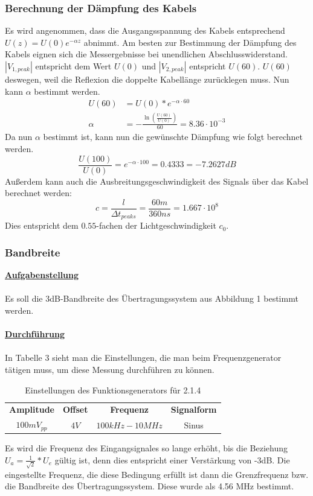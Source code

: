 \documentclass[a4paper,12pt]{article}
\begin{document}
	\subsubsection{Berechnung der Dämpfung des Kabels}
	Es wird angenommen, dass die Ausgangsspannung des Kabels entsprechend 
	\newline
	$U(z) = U(0)e^{-\alpha z}$ abnimmt. Am besten zur Bestimmung der Dämpfung des Kabels eignen sich die Messergebnisse bei unendlichen Abschlusswiderstand. $|V_{1,peak}|$ entspricht dem Wert $U(0)$ und $|V_{2,peak}|$ entspricht $U(60)$. $U(60)$ deswegen, weil die Reflexion die doppelte Kabellänge zurücklegen muss. Nun kann $\alpha$ bestimmt werden.
	\begin{align*}
		U(60) &= U(0) \ast e^{-\alpha \cdot 60} \\
		\alpha &= -\frac{\ln\left( \frac{U(60)}{U(0)}\right)}{60} = 8.36 \cdot 10^{-3}
	\end{align*}
	Da nun $\alpha$ bestimmt ist, kann nun die gewünschte Dämpfung wie folgt berechnet werden.
	\[
		\frac{U(100)}{U(0)} = e^{-\alpha\cdot 100} = 0.4333 = -7.2627dB
	\]
	Außerdem kann auch die Ausbreitungsgeschwindigkeit des Signals über das Kabel berechnet werden:
	\[
		c = \frac{l}{\Delta t_{peaks}} = \frac{60m}{360ns} = 1.667 \cdot 10^8
	\]
	Dies entspricht dem $0.55$-fachen der Lichtgeschwindigkeit $c_0$.
	\subsubsection{Bandbreite}
	\underline{\textbf{Aufgabenstellung}} \\ \\
	Es soll die 3dB-Bandbreite des Übertragungssystem aus Abbildung 1 bestimmt werden. \\ \\
	\underline{\textbf{Durchführung}} \\ \\ 
	In Tabelle 3 sieht man die Einstellungen, die man beim Frequenzgenerator tätigen muss, um diese Messung durchführen zu können.
	\begin{table}[h]
		\centering
		\begin{tabular}{|c|c|c|c|}
			\hline
			\multirow{2}{*}{\textbf{Amplitude}} & \multirow{2}{*}{\textbf{Offset}} & \multirow{2}{*}{\textbf{Frequenz}} & \multirow{2}{*}{\textbf{Signalform}} \\
			&  &  &  \\ \hline
			\multirow{2}{*}{$100mV_{pp}$} & \multirow{2}{*}{$4V$} & \multirow{2}{*}{$100kHz - 10MHz$} & \multirow{2}{*}{Sinus} \\
			&  &  &  \\ \hline
		\end{tabular}
		\caption{Einstellungen des Funktionsgenerators für 2.1.4}
	\end{table}
	\newpage
	\noindent	
	Es wird die Frequenz des Eingangsignales so lange erhöht, bis die Beziehung 
	\newline
	$U_a = \frac{1}{\sqrt{2}} \ast U_e$ gültig ist, denn dies entspricht einer Verstärkung von -3dB. Die eingestellte Frequenz, die diese Bedingung erfüllt ist dann die Grenzfrequenz bzw. die Bandbreite des Übertragungssystem. Diese wurde als 4.56 MHz bestimmt.
\end{document}
